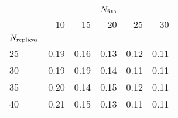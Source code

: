 \begin{center}
    \begin{tabular}{lrrrrr}
        \toprule
        {} & \multicolumn{5}{c}{$N_{\rm fits}$} \\
        {} &   10 &   15 &   20 &   25 &   30 \\
        $N_{\rm replicas}$ &      &      &      &      &      \\
        \midrule
        25            & 0.19 & 0.16 & 0.13 & 0.12 & 0.11 \\
        30            & 0.19 & 0.19 & 0.14 & 0.11 & 0.11 \\
        35            & 0.20 & 0.14 & 0.15 & 0.12 & 0.11 \\
        40            & 0.21 & 0.15 & 0.13 & 0.11 & 0.11 \\
        \bottomrule
        \end{tabular}
\end{center}